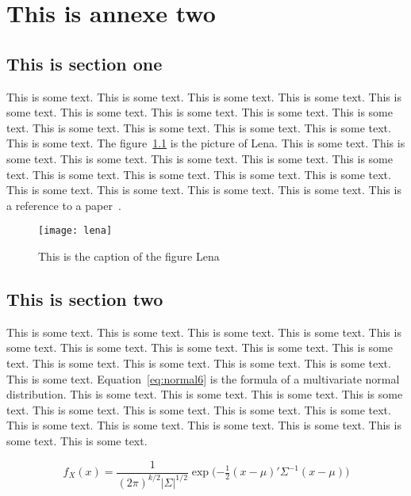 \chapter{This is annexe two}


\section{This is section one}

This is some text. This is some text. This is some text. This is some text. This is some text. This is some text. This is some text. 
This is some text. This is some text. This is some text. This is some text. This is some text. This is some text. This is some text. 
The figure~\ref{fig:lena6} is the picture of Lena.
This is some text. This is some text. This is some text. This is some text. This is some text. This is some text. This is some text. 
This is some text. This is some text. This is some text. This is some text. This is some text. This is some text. This is some text. 
This is a reference to a paper~\cite{Garcia_2008_CVGPU}.

\begin{figure}[htbp]
    \centering
    \texttt{[image: lena]}
    \caption{This is the caption of the figure Lena}
    \label{fig:lena6}
\end{figure}


\section{This is section two}

This is some text. This is some text. This is some text. This is some text. This is some text. This is some text. This is some text. 
This is some text. This is some text. This is some text. This is some text. This is some text. This is some text. This is some text. 
Equation~\ref{eq:normal6} is the formula of a multivariate normal distribution.
This is some text. This is some text. This is some text. This is some text. This is some text. This is some text. This is some text. 
This is some text. This is some text. This is some text. This is some text. This is some text. This is some text. This is some text. 

\begin{equation}
    f_X(x) = \frac{1}{ (2\pi)^{k/2}|\Sigma|^{1/2} } \exp\!\Big( {-\tfrac{1}{2}}(x-\mu)'\Sigma^{-1}(x-\mu) \Big)
    \label{eq:normal6}
\end{equation}


